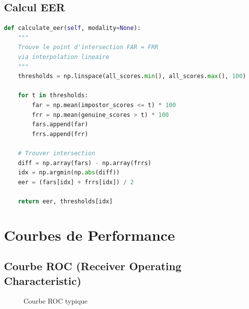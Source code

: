 \documentclass[12pt,a4paper]{report}
\begin{document}
\subsection{Calcul EER}

\begin{lstlisting}[caption={Calcul de l'EER},language=Python]
def calculate_eer(self, modality=None):
    """
    Trouve le point d'intersection FAR = FRR
    via interpolation lineaire
    """
    thresholds = np.linspace(all_scores.min(), all_scores.max(), 100)
    
    for t in thresholds:
        far = np.mean(impostor_scores <= t) * 100
        frr = np.mean(genuine_scores > t) * 100
        fars.append(far)
        frrs.append(frr)
    
    # Trouver intersection
    diff = np.array(fars) - np.array(frrs)
    idx = np.argmin(np.abs(diff))
    eer = (fars[idx] + frrs[idx]) / 2
    
    return eer, thresholds[idx]
\end{lstlisting}

\section{Courbes de Performance}

\subsection{Courbe ROC (Receiver Operating Characteristic)}

\begin{figure}[H]
    \centering
    \caption{Courbe ROC typique}
    \label{fig:roc}
\end{figure}
\end{document}
